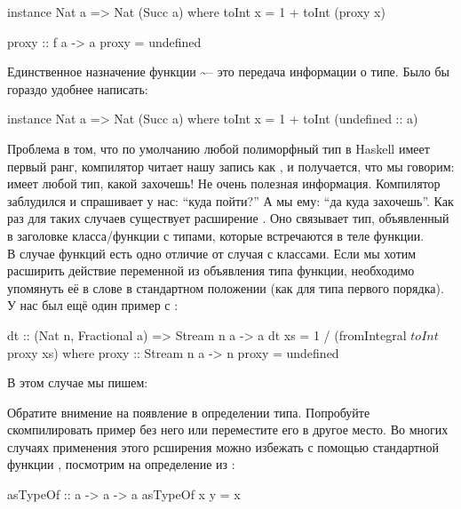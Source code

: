 \begin{code}
instance Nat a => Nat (Succ a) where
    toInt x = 1 + toInt (proxy x)
        
proxy :: f a -> a
proxy = undefined
\end{code}

Единственное назначение функции \textasciitilde{}-- это
передача информации о типе. Было бы гораздо удобнее написать:


\begin{code}
instance Nat a => Nat (Succ a) where
    toInt x = 1 + toInt (undefined :: a)
\end{code}

Проблема в том, что по умолчанию любой полиморфный тип в Haskell имеет
первый ранг, компилятор читает нашу запись как ,
и получается, что мы говорим:  имеет любой тип, какой захочешь! Не
очень полезная информация. Компилятор заблудился и спрашивает у нас:
``куда пойти?'' А мы ему: ``да куда захочешь''. Как раз для таких
случаев существует расширение . Оно связывает
тип, объявленный в заголовке класса/функции с типами, которые
встречаются в теле функции.\\В случае функций есть одно отличие от
случая с классами. Если мы хотим расширить действие переменной из
объявления типа функции, необходимо упомянуть её в слове  в
стандартном положении (как для типа первого порядка). У нас был ещё один
пример с :


\begin{code}
dt :: (Nat n, Fractional a) => Stream n a -> a
dt xs = 1 / (fromIntegral $ toInt $ proxy xs)
    where proxy :: Stream n a -> n
          proxy = undefined
\end{code}

В этом случае мы пишем:



Обратите внимение на появление  в определении типа.
Попробуйте скомпилировать пример без него или переместите его в другое
место. Во многих случаях применения этого рсширения можно избежать с
помощью стандартной функции , посмотрим на определение из
:


\begin{code}
asTypeOf :: a -> a -> a
asTypeOf x y = x
\end{code}

